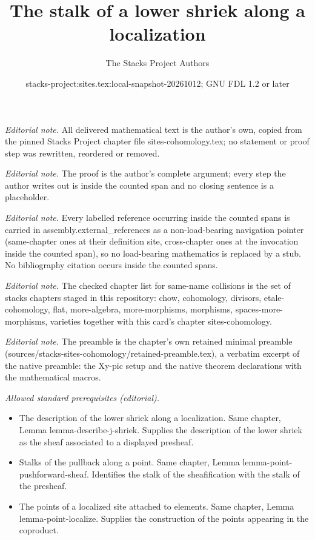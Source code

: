 \documentclass[10pt,a4paper]{amsart}
\title{The stalk of a lower shriek along a localization}
\author{The Stacks Project Authors}
\date{stacks-project:sites.tex:local-snapshot-20261012; GNU FDL 1.2 or later}
\theoremstyle{plain}
\theoremstyle{definition}
\theoremstyle{remark}
\numberwithin{equation}{subsection}
\begin{document}
\maketitle
\noindent\textit{Editorial note.} All delivered mathematical text is the author's own, copied from the pinned Stacks Project chapter file sites-cohomology.tex; no statement or proof step was rewritten, reordered or removed.\par\medskip
\noindent\textit{Editorial note.} The proof is the author's complete argument; every step the author writes out is inside the counted span and no closing sentence is a placeholder.\par\medskip
\noindent\textit{Editorial note.} Every labelled reference occurring inside the counted spans is carried in assembly.external\_references as a non-load-bearing navigation pointer (same-chapter ones at their definition site, cross-chapter ones at the invocation inside the counted span), so no load-bearing mathematics is replaced by a stub. No bibliography citation occurs inside the counted spans.\par\medskip
\noindent\textit{Editorial note.} The checked chapter list for same-name collisions is the set of stacks chapters staged in this repository: chow, cohomology, divisors, etale-cohomology, flat, more-algebra, more-morphisms, morphisms, spaces-more-morphisms, varieties together with this card's chapter sites-cohomology.\par\medskip
\noindent\textit{Editorial note.} The preamble is the chapter's own retained minimal preamble (sources/stacks-sites-cohomology/retained-preamble.tex), a verbatim excerpt of the native preamble: the Xy-pic setup and the native theorem declarations with the mathematical macros.\par\medskip
\noindent\textit{Allowed standard prerequisites (editorial).}\begin{itemize}
\item The description of the lower shriek along a localization. Same chapter, Lemma lemma-describe-j-shriek. Supplies the description of the lower shriek as the sheaf associated to a displayed presheaf.
\item Stalks of the pullback along a point. Same chapter, Lemma lemma-point-pushforward-sheaf. Identifies the stalk of the sheafification with the stalk of the presheaf.
\item The points of a localized site attached to elements. Same chapter, Lemma lemma-point-localize. Supplies the construction of the points appearing in the coproduct.
\end{itemize}\medskip
\end{document}
